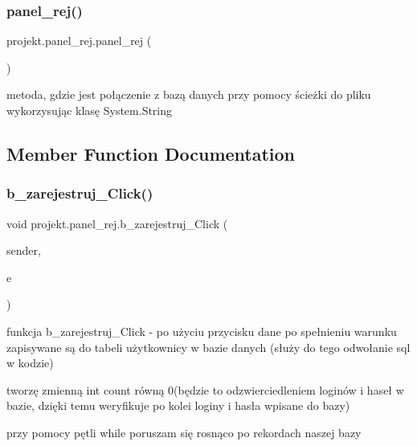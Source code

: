 \subsubsection{\texorpdfstring{panel\+\_\+rej()}{panel\_rej()}}
{\footnotesize\ttfamily projekt.\+panel\+\_\+rej.\+panel\+\_\+rej (\begin{DoxyParamCaption}{ }\end{DoxyParamCaption})\hspace{0.3cm}{\ttfamily [inline]}}



metoda, gdzie jest połączenie z bazą danych przy pomocy ścieżki do pliku wykorzysując klasę System.\+String 



\subsection{Member Function Documentation}
\mbox{\label{classprojekt_1_1panel__rej_aea82627753b6eee1ed0fef05c784fadc}} 
\subsubsection{\texorpdfstring{b\+\_\+zarejestruj\+\_\+\+Click()}{b\_zarejestruj\_Click()}}
{\footnotesize\ttfamily void projekt.\+panel\+\_\+rej.\+b\+\_\+zarejestruj\+\_\+\+Click (\begin{DoxyParamCaption}\item[{object}]{sender,  }\item[{Routed\+Event\+Args}]{e }\end{DoxyParamCaption})\hspace{0.3cm}{\ttfamily [inline]}}



funkcja b\+\_\+zarejestruj\+\_\+\+Click -\/ po użyciu przycisku dane po spełnieniu warunku zapisywane są do tabeli użytkownicy w bazie danych (służy do tego odwołanie sql w kodzie) 

tworzę zmienną int count równą 0(będzie to odzwierciedleniem loginów i haseł w bazie, dzięki temu weryfikuje po kolei loginy i hasła wpisane do bazy)

przy pomocy pętli while poruszam się rosnąco po rekordach naszej bazy

